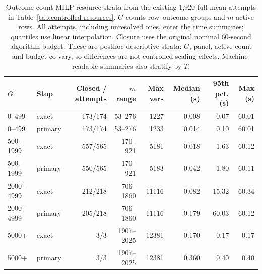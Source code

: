 \begin{table}[t]
\centering\small
\begin{tabular}{llrrrrrr}
\toprule
$G$ & Stop & Closed / attempts & $m$ range & Max vars & Median (s) & 95th pct. (s) & Max (s) \\
\midrule
0--499 & exact & 173/174 & 53--276 & 1227 & 0.008 & 0.07 & 60.01 \\
0--499 & primary & 173/174 & 53--276 & 1233 & 0.014 & 0.10 & 60.01 \\
500--1999 & exact & 557/565 & 170--921 & 5181 & 0.018 & 1.63 & 60.12 \\
500--1999 & primary & 550/565 & 170--921 & 5183 & 0.042 & 1.80 & 60.11 \\
2000--4999 & exact & 212/218 & 706--1860 & 11116 & 0.082 & 15.32 & 60.34 \\
2000--4999 & primary & 205/218 & 706--1860 & 11116 & 0.179 & 60.03 & 60.12 \\
5000+ & exact & 3/3 & 1907--2025 & 12381 & 0.170 & 0.17 & 0.17 \\
5000+ & primary & 3/3 & 1907--2025 & 12381 & 0.360 & 0.40 & 0.40 \\
\bottomrule
\end{tabular}
\caption{Outcome-count MILP resource strata from the existing 1,920 full-mean attempts in Table~\ref{tab:controlled-resources}. $G$ counts row--outcome groups and $m$ active rows. All attempts, including unresolved ones, enter the time summaries; quantiles use linear interpolation. Closure uses the original nominal 60-second algorithm budget. These are posthoc descriptive strata: $G$, panel, active count and budget co-vary, so differences are not controlled scaling effects. Machine-readable summaries also stratify by $T$.}
\label{tab:resource-strata}
\end{table}
